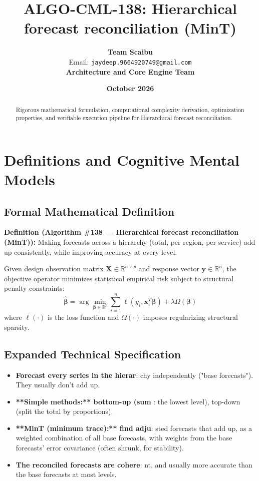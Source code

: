 \documentclass[11pt,a4paper]{article}
\title{\textbf{ALGO-CML-138: Hierarchical forecast reconciliation (MinT)}}
\author{\textbf{Team Scaibu} \\ \small Email: \texttt{jaydeep.9664920749@gmail.com} \\ \small \textbf{Architecture and Core Engine Team}}
\date{\textbf{October 2026}}
\theoremstyle{definition}
\begin{document}
\maketitle

\begin{abstract}
Rigorous mathematical formulation, computational complexity derivation, optimization properties, and verifiable execution pipeline for Hierarchical forecast reconciliation.
\end{abstract}

\section{Definitions and Cognitive Mental Models}

\subsection{Formal Mathematical Definition}
\textbf{Definition (Algorithm \#138 --- Hierarchical forecast reconciliation (MinT)):}
Making forecasts across a hierarchy (total, per region, per service) add up consistently, while improving accuracy at every level.

Given design observation matrix $\mathbf{X} \in \mathbb{R}^{n \times p}$ and response vector $\mathbf{y} \in \mathbb{R}^n$, the objective operator minimizes statistical empirical risk subject to structural penalty constraints:
\begin{equation}
\hat{\boldsymbol{\beta}} = \arg\min_{\boldsymbol{\beta} \in \mathbb{R}^p} \sum_{i=1}^n \ell(y_i, \mathbf{x}_i^T \boldsymbol{\beta}) + \lambda \Omega(\boldsymbol{\beta})
\end{equation}
where $\ell(\cdot)$ is the loss function and $\Omega(\cdot)$ imposes regularizing structural sparsity.

\subsection{Expanded Technical Specification}
\begin{itemize}
\item \textbf{Forecast every series in the hierar}: chy independently ("base forecasts"). They usually don't add up.
\item \textbf{**Simple methods:** bottom-up (sum }: the lowest level), top-down (split the total by proportions).
\item \textbf{**MinT (minimum trace):** find adju}: sted forecasts that add up, as a weighted combination of all base forecasts, with weights from the base forecasts' error covariance (often shrunk, for stability).
\item \textbf{The reconciled forecasts are cohere}: nt, and usually more accurate than the base forecasts at most levels.
\end{itemize}
\end{document}
